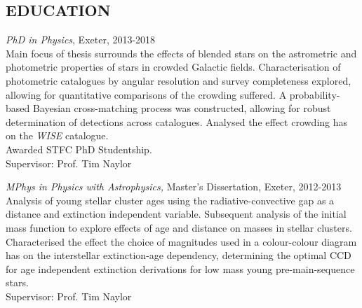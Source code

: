 \documentclass[letter, margin, 10pt]{res} %
\begin{document}
\begin{resume}

 



\section{EDUCATION}

{\sl PhD in Physics}, Exeter, 2013-2018\\
Main focus of thesis surrounds the effects of blended stars on the astrometric and photometric properties of stars in crowded Galactic fields. Characterisation of photometric catalogues by angular resolution and survey completeness explored, allowing for quantitative comparisons of the crowding suffered. A probability-based Bayesian cross-matching process was constructed, allowing for robust determination of detections across catalogues. Analysed the effect crowding has on the \textit{WISE} catalogue. \\Awarded STFC PhD Studentship. \\Supervisor: Prof. Tim Naylor

{\sl MPhys in Physics with Astrophysics,} Master's Dissertation, Exeter, 2012-2013 \\
Analysis of young stellar cluster ages using the radiative-convective gap as a distance and extinction independent variable. Subsequent analysis of the initial mass function to explore effects of age and distance on masses in stellar clusters. Characterised the effect the choice of magnitudes used in a colour-colour diagram has on the interstellar extinction-age dependency, determining the optimal CCD for age independent extinction derivations for low mass young pre-main-sequence stars. \\Supervisor: Prof. Tim Naylor


\end{resume}
\end{document}
